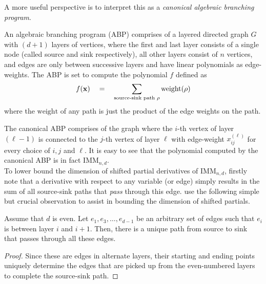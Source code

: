 A more useful perspective is to interpret this as a \emph{canonical algebraic branching program}. 

\begin{definition}
An algebraic branching program (ABP) comprises of a layered directed graph $G$ with $(d+1)$ layers of vertices, where the first and last layer consists of a single node (called source and sink respectively), all other layers consist of $n$ vertices, and edges are only between successive layers and have linear polynomials as edge-weights. 
The ABP is set to compute the polynomial $f$ defined as
$$
f(\mathbf{x}) \quad = \quad \sum_{\text{source-sink path $\rho$}} \mathrm{weight}(\rho)
$$
where the $\mathrm{weight}$ of any path is just the product of the edge weights on the path. 
\end{definition}

The canonical ABP comprises of the graph where the $i$-th vertex of layer $(\ell-1)$ is connected to the $j$-th vertex of layer $\ell$ with edge-weight $x_{ij}^{(\ell)}$ for every choice of $i,j$ and $\ell$. 
It is easy to see that the polynomial computed by the canonical ABP is in fact $\mathrm{IMM}_{n,d}$. \\

To lower bound the dimension of shifted partial derivatives of $\mathrm{IMM}_{n,d}$, firstly note that a derivative with respect to any variable (or edge) simply results in the sum of all source-sink paths that \emph{pass} through this edge. \cite{FLMS13} use the following simple but crucial observation to assist in bounding the dimension of shifted partials. 

\begin{observation}\label{obs:odd-layer-unique-path}
Assume that $d$ is even. 
Let $e_1,e_3,\dots, e_{d-1}$ be an arbitrary set of edges such that $e_i$ is between layer $i$ and $i+1$. 
Then, there is a unique path from source to sink that passes through all these edges. 
\end{observation}
\begin{proof}
Since these are edges in alternate layers, their starting and ending points uniquely determine the edges that are picked up from the even-numbered layers to complete the source-sink path.
\end{proof}

